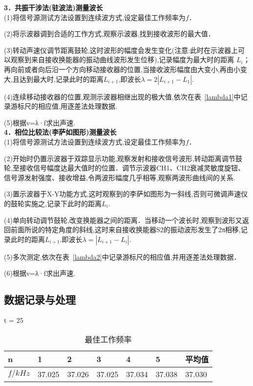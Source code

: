 \documentclass[12pt,a4paper,oneside,UTF8]{ctexart}
\begin{document}
\textbf{3．共振干涉法(驻波法)测量波长}\\

(1)将信号源测试方法设置到连续波方式,设定最佳工作频率为$f$．

(2)将示波器调到合适的工作方式,观察示波器,找到接收波形的最大值．

(3)转动声速仪调节距离鼓轮,这时波形的幅度会发生变化(注意:此时在示波器上可以观察到来自接收换能器的振动曲线波形发生位移),记录幅度为最大时的距离 $ L_{i} $；再向前或者向后沿一个方向移动接收器的位置,当接收波形幅度由大变小,再由小变大,且达到最大时,记录此时的距离$L_{i+1}$,即波长$ \lambda = 2|L_{i+1} - L_1|$.

(4)连续移动接收器的位置,观测示波器相继出现的极大值,依次在表~\ref{lambda1}中记录游标尺的相应值,用逐差法处理数据.

(5)根据v=λ·f求出声速.\\

\textbf{4．相位比较法(李萨如图形)测量波长}\\

(1)将信号源测试方法设置到连续波方式,设定最佳工作频率为$f$．

(2)开始时仍置示波器于双踪显示功能,观察发射和接收信号波形,转动距离调节鼓轮,至接收信号幅度达最大值时的位置．调节示波器CH1、CH2衰减灵敏度旋钮、信号源发射强度、接收增益,令两波形幅度几乎相等,观察两波形曲线间的关系.

(3)置示波器于X-Y功能方式,这时观察到的李萨如图形为一斜线,否则可微调声速仪的鼓轮实施之,记录下此时的距离$L_i$.

(4)单向转动调节鼓轮,改变换能器之间的距离．当移动一个波长时,观察到波形又返回前面所说的特定角度的斜线,这时来自接收换能器S2的振动波形发生了2π相移,记录此时的距离$ L_{i+1} $.即波长$ \lambda = |L_{i+1} - L_i|$.

(5)多次测定,依次在表~\ref{lambda2}中记录游标尺的相应值,并用逐差法处理数据．

(6)根据v=λ·f求出声速.

\subsection{数据记录与处理}

\begin{table}[h]
	\raggedright
	\caption{最佳工作频率}
	\label{frequency}
	t = 25	\\
	\centering
	\begin{tabular}{p{1.5cm}<{\centering}|p{1.5cm}<{\centering}|p{1.5cm}<{\centering}|m{1.5cm}<{\centering}|p{1.5cm}<{\centering}|p{1.5cm}<{\centering}|p{1.5cm}<{\centering}}
		n&1&2&3&4&5&平均值\\ \hline
		$f/kHz$&37.025&37.026&37.025&37.034&37.038&37.030\\

	\end{tabular}
\end{table}
\end{document}
